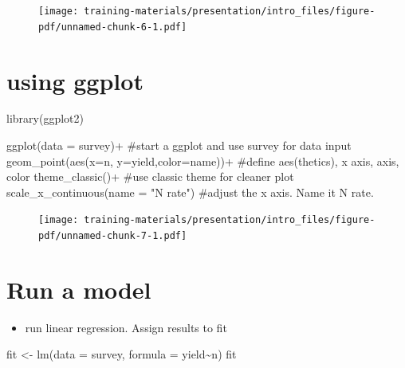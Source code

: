 \documentclass[
  letterpaper,
  DIV=11,
  numbers=noendperiod]{scrreprt}
\newenvironment{Shaded}{\begin{snugshade}}{\end{snugshade}}
\newcommand{\AttributeTok}[1]{\textcolor[rgb]{0.40,0.45,0.13}{#1}}
\newcommand{\CommentTok}[1]{\textcolor[rgb]{0.37,0.37,0.37}{#1}}
\newcommand{\FunctionTok}[1]{\textcolor[rgb]{0.28,0.35,0.67}{#1}}
\newcommand{\NormalTok}[1]{\textcolor[rgb]{0.00,0.23,0.31}{#1}}
\newcommand{\OtherTok}[1]{\textcolor[rgb]{0.00,0.23,0.31}{#1}}
\newcommand{\SpecialCharTok}[1]{\textcolor[rgb]{0.37,0.37,0.37}{#1}}
\newcommand{\StringTok}[1]{\textcolor[rgb]{0.13,0.47,0.30}{#1}}
\providecommand{\tightlist}{%
  \setlength{\itemsep}{0pt}\setlength{\parskip}{0pt}}\usepackage{longtable,booktabs,array}
\begin{document}
\begin{figure}[H]

{\centering \texttt{[image: training-materials/presentation/intro\_files/figure-pdf/unnamed-chunk-6-1.pdf]}

}

\end{figure}

\hypertarget{using-ggplot}{%
\section{using ggplot}\label{using-ggplot}}

\begin{Shaded}
\begin{Highlighting}[]
\FunctionTok{library}\NormalTok{(ggplot2)}

\FunctionTok{ggplot}\NormalTok{(}\AttributeTok{data =}\NormalTok{ survey)}\SpecialCharTok{+} \CommentTok{\#start a ggplot and use survey for data input}
  \FunctionTok{geom\_point}\NormalTok{(}\FunctionTok{aes}\NormalTok{(}\AttributeTok{x=}\NormalTok{n, }\AttributeTok{y=}\NormalTok{yield,}\AttributeTok{color=}\NormalTok{name))}\SpecialCharTok{+} \CommentTok{\#define aes(thetics), x axis, axis, color}
  \FunctionTok{theme\_classic}\NormalTok{()}\SpecialCharTok{+} \CommentTok{\#use classic theme for cleaner plot}
  \FunctionTok{scale\_x\_continuous}\NormalTok{(}\AttributeTok{name =} \StringTok{"N rate"}\NormalTok{) }\CommentTok{\#adjust the x axis. Name it N rate.}
\end{Highlighting}
\end{Shaded}

\begin{figure}[H]

{\centering \texttt{[image: training-materials/presentation/intro\_files/figure-pdf/unnamed-chunk-7-1.pdf]}

}

\end{figure}

\hypertarget{run-a-model}{%
\section{Run a model}\label{run-a-model}}

\begin{itemize}
\tightlist
\item
  run linear regression. Assign results to fit
\end{itemize}

\begin{Shaded}
\begin{Highlighting}[]
\NormalTok{fit }\OtherTok{\textless{}{-}} \FunctionTok{lm}\NormalTok{(}\AttributeTok{data =}\NormalTok{ survey, }\AttributeTok{formula =}\NormalTok{ yield}\SpecialCharTok{\textasciitilde{}}\NormalTok{n)}
\NormalTok{fit}
\end{Highlighting}
\end{Shaded}
\end{document}
